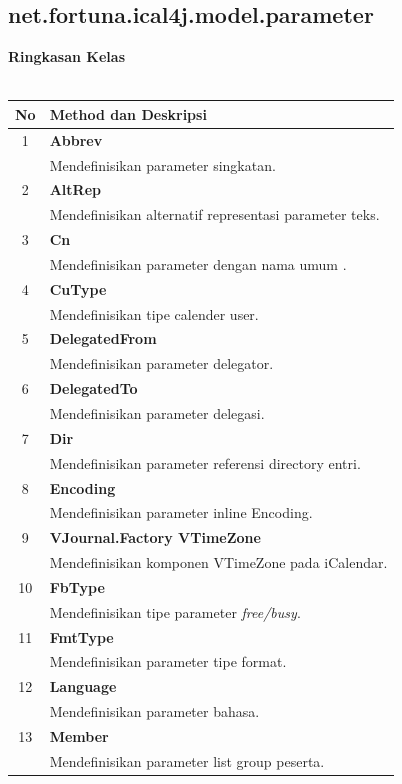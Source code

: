 \subsection{net.fortuna.ical4j.model.parameter}

	\noindent \textbf{Ringkasan Kelas}\cite{ical}\\ \\
	\begin{tabular}{|c|p{12cm}|}
		\hline
		\textbf{No} & \textbf{Method dan Deskripsi} \\ \hline \hline
		1 & \textbf{Abbrev}\\
			&	Mendefinisikan parameter singkatan.\\ \hline
		2 & \textbf{AltRep}\\
			&	Mendefinisikan alternatif representasi parameter teks. \\ \hline
		3 & \textbf{Cn}\\
			&	Mendefinisikan parameter dengan nama umum .\\ \hline
		4 & \textbf{CuType}\\
			&	Mendefinisikan tipe calender user.\\ \hline
		5 & \textbf{DelegatedFrom}\\
			&	Mendefinisikan parameter delegator.\\ \hline
		6 & \textbf{DelegatedTo}\\
			&	Mendefinisikan parameter delegasi.\\ \hline
		7 & \textbf{Dir}\\
			&	Mendefinisikan parameter referensi directory entri.\\ \hline
		8 & \textbf{Encoding}\\
			&	Mendefinisikan parameter inline Encoding.\\ \hline
		9 & \textbf{VJournal.Factory	 
VTimeZone}\\
			&	Mendefinisikan komponen VTimeZone pada iCalendar.\\ \hline
		10 & \textbf{FbType}\\
			&	Mendefinisikan tipe parameter \textit{free/busy}.\\ \hline
		11 & \textbf{FmtType}\\
			&	Mendefinisikan parameter tipe format.\\ \hline
		12 & \textbf{Language}\\
			&	Mendefinisikan parameter bahasa.\\ \hline
		13 & \textbf{Member}\\
			&	Mendefinisikan parameter list group peserta.\\ \hline

\end{tabular}

